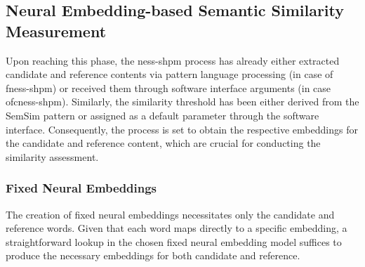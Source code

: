 \documentclass[11pt]{scrreprt}
\begin{document}
%
%


\subsection{Neural Embedding-based Semantic Similarity Measurement}
\label{sec:neural-embedding-based-semantic-similarity-measurement}
Upon reaching this phase, the \gls{ness-shpm} process has already either extracted candidate and reference contents via pattern language processing (in case of \gls{fness-shpm}) or received them through software interface arguments (in case of\gls{cness-shpm}). Similarly, the similarity threshold has been either derived from the SemSim pattern or assigned as a default parameter through the software interface. Consequently, the process is set to obtain the respective embeddings for the candidate and reference content, which are crucial for conducting the similarity assessment.



\subsubsection{Fixed Neural Embeddings}
The creation of fixed neural embeddings necessitates only the candidate and reference words. Given that each word maps directly to a specific embedding, a straightforward lookup in the chosen fixed neural embedding model suffices to produce the necessary embeddings for both candidate and reference.
\end{document}

